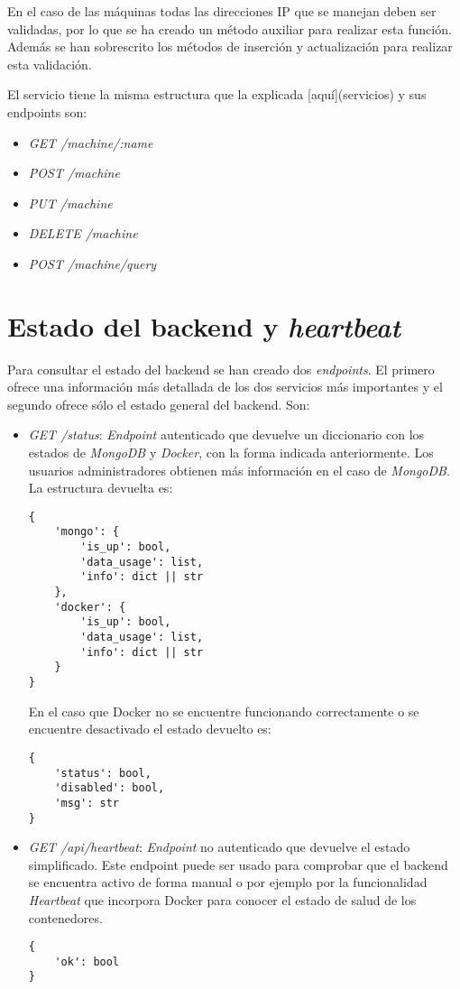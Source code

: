 \bigskip
En el caso de las máquinas todas las direcciones IP que se manejan deben ser validadas, por lo que se ha creado un método auxiliar para realizar esta función. Además se han sobrescrito los métodos de inserción y actualización para realizar esta validación.

\bigskip
El servicio tiene la misma estructura que la explicada [aquí](servicios) y sus endpoints son:
\begin{itemize}
	\item \textit{GET /machine/:name}
	\item \textit{POST /machine}
	\item \textit{PUT /machine}
	\item \textit{DELETE /machine}
	\item \textit{POST /machine/query}
\end{itemize}



\section{Estado del backend y \textit{heartbeat}}


Para consultar el estado del backend se han creado dos \textit{endpoints}. El primero ofrece una información más detallada de los dos servicios más importantes y el segundo ofrece sólo el estado general del backend. Son:
\begin{itemize}
	\item \textit{GET /status}: \textit{Endpoint} autenticado que devuelve un diccionario con los estados de \textit{MongoDB} y \textit{Docker}, con la forma indicada anteriormente. Los usuarios administradores obtienen más información en el caso de \textit{MongoDB}. La estructura devuelta es:

\begin{lstlisting}
{
	'mongo': {
		'is_up': bool,
		'data_usage': list,
		'info': dict || str
	},
	'docker': {
		'is_up': bool,
		'data_usage': list,
		'info': dict || str
	}
}
\end{lstlisting}

\bigskip	
En el caso que Docker no se encuentre funcionando correctamente o se encuentre desactivado el estado devuelto es:
	
\begin{lstlisting}
{
	'status': bool,
	'disabled': bool,
	'msg': str
}
\end{lstlisting}
	
	\item \textit{GET /api/heartbeat}: \textit{Endpoint} no autenticado que devuelve el estado simplificado. Este endpoint puede ser usado para comprobar que el backend se encuentra activo de forma manual o por ejemplo por la funcionalidad \textit{Heartbeat} que incorpora Docker para conocer el estado de salud de los contenedores.
	
\begin{lstlisting}
{
	'ok': bool
}
\end{lstlisting}
\end{itemize}



